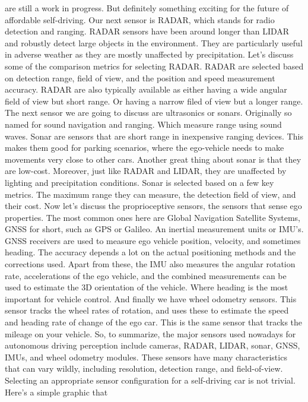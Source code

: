 are still a work in progress. But definitely something exciting for
the future of affordable self-driving. Our next sensor is RADAR, which stands for
radio detection and ranging. RADAR sensors have been
around longer than LIDAR and robustly detect large
objects in the environment. They are particularly useful in adverse
weather as they are mostly unaffected by precipitation. Let's discuss some of the comparison
metrics for selecting RADAR. RADAR are selected based on
detection range, field of view, and the position and
speed measurement accuracy. RADAR are also typically available as
either having a wide angular field of view but short range. Or having a narrow filed of view but
a longer range. The next sensor we are going to
discuss are ultrasonics or sonars. Originally so named for
sound navigation and ranging. Which measure range using sound waves. Sonar are sensors that are short
range in inexpensive ranging devices. This makes them good for
parking scenarios, where the ego-vehicle needs to make
movements very close to other cars. Another great thing about sonar
is that they are low-cost. Moreover, just like RADAR and LIDAR,
they are unaffected by lighting and precipitation conditions. Sonar is selected based
on a few key metrics. The maximum range they can measure, the
detection field of view, and their cost. Now let's discuss
the proprioceptive sensors, the sensors that sense ego properties. The most common ones here
are Global Navigation Satellite Systems, GNSS for short, such as GPS or Galileo. An inertial measurement units or IMU's. GNSS receivers are used to measure
ego vehicle position, velocity, and sometimes heading. The accuracy depends a lot on
the actual positioning methods and the corrections used. Apart from these, the IMU also
measures the angular rotation rate, accelerations of the ego vehicle, and
the combined measurements can be used to estimate the 3D orientation
of the vehicle. Where heading is the most important for
vehicle control. And finally we have
wheel odometry sensors. This sensor tracks the wheel
rates of rotation, and uses these to estimate the speed and
heading rate of change of the ego car. This is the same sensor that tracks
the mileage on your vehicle. So, to summarize,
the major sensors used nowadays for autonomous driving perception
include cameras, RADAR, LIDAR, sonar, GNSS, IMUs,
and wheel odometry modules. These sensors have many
characteristics that can vary wildly, including resolution,
detection range, and field-of-view. Selecting an appropriate
sensor configuration for a self-driving car is not trivial. Here's a simple graphic that
